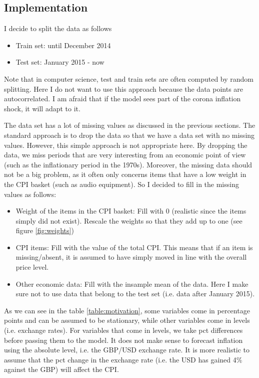\documentclass[12pt]{article}
\begin{document}
\subsection{Implementation}
I decide to split the data as follows
\begin{itemize}
\item Train set: until December 2014
\item Test set: January 2015 - now
\end{itemize}
Note that in computer science, test and train sets are often computed by random splitting. Here I do not want to use this approach because the data points are autocorrelated. I am afraid that if the model sees part of the corona inflation shock, it will adapt to it. 


The data set has a lot of missing values as discussed in the previous sections. The standard approach is to drop the data so that we have a data set with no missing values. However, this simple approach is not appropriate here. By dropping the data, we miss periods that are very interesting from an economic point of view (such as the inflationary period in the 1970s). Moreover, the missing data should not be a big problem, as it often only concerns items that have a low weight in the CPI basket (such as audio equipment). So I decided to fill in the missing values as follows:
\begin{itemize}
\item Weight of the items in the CPI basket: Fill with 0 (realistic since the items simply did not exist). Rescale the weights so that they add up to one (see figure \ref{fig:weights})
\item CPI items: Fill with the value of the total CPI. This means that if an item is missing/absent, it is assumed to have simply moved in line with the overall price level.
\item Other economic data: Fill with the insample mean of the data. Here I make sure not to use data that belong to the test set (i.e. data after January 2015).
\end{itemize}


As we can see in the table \ref{table:motivation}, some variables come in percentage points and can be assumed to be stationary, while other variables come in levels (i.e. exchange rates). For variables that come in levels, we take pct differences before passing them to the model. It does not make sense to forecast inflation using the absolute level, i.e. the GBP/USD exchange rate. It is more realistic to assume that the pct change in the exchange rate (i.e. the USD has gained 4\% against the GBP) will affect the CPI.
\end{document}
